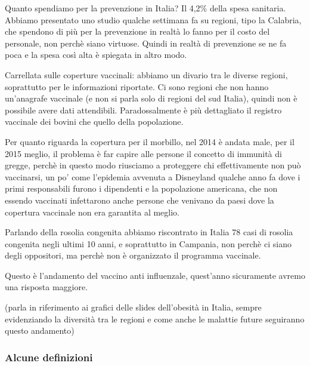 Quanto spendiamo per la prevenzione in Italia? Il 4,2\% della spesa
sanitaria. Abbiamo presentato uno studio qualche settimana fa su
regioni, tipo la Calabria, che spendono di più per la prevenzione in
realtà lo fanno per il costo del personale, non perchè siano virtuose.
Quindi in realtà di prevenzione se ne fa poca e la spesa così alta è
spiegata in altro modo.

Carrellata sulle coperture vaccinali: abbiamo un divario tra le diverse
regioni, soprattutto per le informazioni riportate. Ci sono regioni che
non hanno un'anagrafe vaccinale (e non si parla solo di regioni del sud
Italia), quindi non è possibile avere dati attendibili. Paradossalmente
è più dettagliato il registro vaccinale dei bovini che quello della
popolazione.

Per quanto riguarda la copertura per il morbillo, nel 2014 è andata
male, per il 2015 meglio, il problema è far capire alle persone il
concetto di immunità di gregge, perchè in questo modo riusciamo a
proteggere chi effettivamente non può vaccinarsi, un po' come l'epidemia
avvenuta a Disneyland qualche anno fa dove i primi responsabili furono i
dipendenti e la popolazione americana, che non essendo vaccinati
infettarono anche persone che venivano da paesi dove la copertura
vaccinale non era garantita al meglio.

Parlando della rosolia congenita abbiamo riscontrato in Italia 78 casi
di rosolia congenita negli ultimi 10 anni, e soprattutto in Campania,
non perchè ci siano degli oppositori, ma perchè non è organizzato il
programma vaccinale.

Questo è l'andamento del vaccino anti influenzale, quest'anno
sicuramente avremo una risposta maggiore.

(parla in riferimento ai grafici delle slides dell'obesità in Italia,
sempre evidenziando la diversità tra le regioni e come anche le malattie
future seguiranno questo andamento)

\subsubsection{Alcune definizioni}

